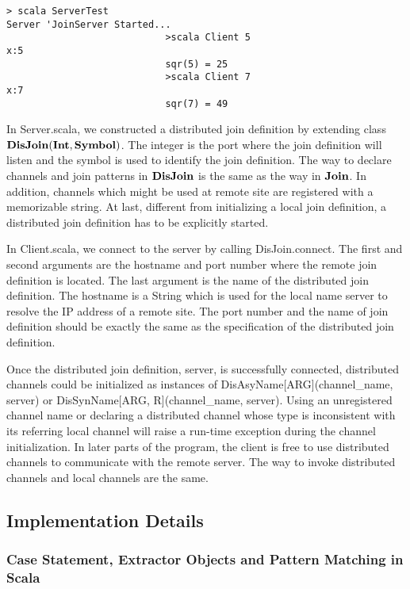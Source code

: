 \begin{lstlisting}
> scala ServerTest                                    
Server 'JoinServer Started...
							>scala Client 5
x:5
							sqr(5) = 25
							>scala Client 7
x:7
							sqr(7) = 49
\end{lstlisting}


In Server.scala, we constructed a distributed join definition by extending class \\ $\bf{DisJoin(Int, Symbol)}$.  The integer is the port where the join definition will listen and the symbol is used to identify the join definition.  The way to declare channels and join patterns in $\bf{DisJoin}$ is the same as the way in $\bf{Join}$.  In addition,  channels which might be used at remote site are registered with a memorizable string.  At last, different from initializing a local join definition, a distributed join definition has to be explicitly started.

In Client.scala, we connect to the server by calling DisJoin.connect.  The first and second arguments are the hostname and port number where the remote join definition is located.  The last argument is the name of the distributed join definition.  The hostname is a String which is used for the local name server to resolve the IP address of a remote site.  The port number and the name of join definition should be exactly the same as the specification of the distributed join definition.

Once the distributed join definition, server, is successfully connected, distributed channels could be initialized as instances of DisAsyName[ARG](channel\_name, server) or DisSynName[ARG, R](channel\_name, server).  Using an unregistered channel name or declaring a distributed channel whose type is inconsistent with  its referring local channel will raise a run-time exception during the channel initialization.  In later parts of the program, the client is free to use distributed channels to communicate with the remote server.  The way to invoke distributed channels and local channels are the same.

\subsection{Implementation Details}
\subsubsection{Case Statement, Extractor Objects and Pattern Matching in Scala}

